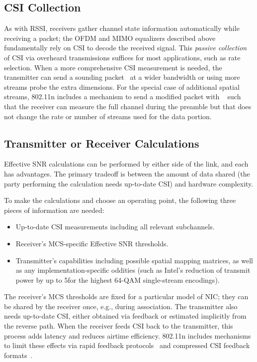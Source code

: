 \subsection{CSI Collection}
As with RSSI, receivers gather channel state information automatically while receiving a packet; the OFDM and MIMO equalizers described above fundamentally rely on CSI to decode the received signal. This \emph{passive collection} of CSI via overheard transmissions suffices for most applications, such as rate selection. When a more comprehensive CSI measurement is needed, the transmitter can send a sounding packet~\cite[\S20.3.13.1]{80211n} at a wider bandwidth or using more streams probe the extra dimensions. For the special case of additional spatial streams, 802.11n includes a mechanism to send a modified packet with ~\cite[\S20.3.9.4.6]{80211n} such that the receiver can measure the full channel during the preamble but that does not change the rate or number of streams used for the data portion.

\subsection{Transmitter or Receiver Calculations}
Effective SNR calculations can be performed by either side of the link, and each has advantages. The primary tradeoff is between the amount of data shared (the party performing the calculation needs up-to-date CSI) and hardware complexity.

 To make the calculations and choose an operating point, the following three pieces of information are needed:
\begin{itemize}
	\item Up-to-date CSI measurements including all relevant subchannels.
	\item Receiver's MCS-specific Effective SNR thresholds.
	\item Transmitter's capabilities including possible spatial mapping matrices, as well as any implementation-specific oddities (such as Intel's reduction of transmit power by up to 5\dB for the highest 64-QAM single-stream encodings).
\end{itemize}

 The receiver's MCS thresholds are fixed for a particular model of NIC; they can be shared by the receiver once, e.g., during association. The transmitter also needs up-to-date CSI, either obtained via feedback or estimated implicitly from the reverse path. When the receiver feeds CSI back to the transmitter, this process adds latency and reduces airtime efficiency. 802.11n includes mechanisms to limit these effects via rapid feedback protocols~\cite[\S9.19.2]{80211n} and compressed CSI feedback formats~\cite[\S20.3.12.2.5]{80211n}.

